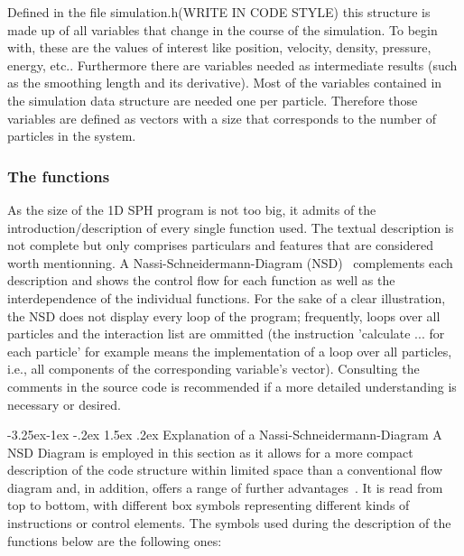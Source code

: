 \documentclass{report}
\makeatletter
\renewcommand\paragraph{\@startsection{paragraph}{4}{\z@}%
  {-3.25ex\@plus -1ex \@minus -.2ex}%
  {1.5ex \@plus .2ex}%
  {\normalfont\normalsize\bfseries}}
\makeatother
\begin{document}
Defined in the file simulation.h(WRITE IN CODE STYLE) this structure is made up of all 
variables that change in the course of the simulation. To begin with, these are the 
values of interest like position, velocity, density, pressure, energy, etc.. 
Furthermore there are variables needed as intermediate results (such as the smoothing 
length and its derivative). 
Most of the variables contained in the simulation data structure are needed one per 
particle. Therefore those variables are defined as vectors with a size that corresponds 
to the number of particles in the system. 

\subsubsection{The functions}

As the size of the 1D SPH program is not too big, it admits of the 
introduction/description of every single function used. The textual description is not complete but only comprises particulars and features that are considered worth mentionning. A Nassi-Schneidermann-Diagram (NSD)~\cite{Nassi1973} complements each description and shows the control flow for each function as well as the interdependence of the individual functions. For the sake of a clear illustration, the NSD does not display every loop of the program; frequently, loops over all particles and the interaction list are ommitted (the instruction 'calculate ... for each particle' for example means the implementation of a loop over all particles, i.e., all components of the corresponding variable's vector).  Consulting the comments in the source code is recommended if a more detailed understanding is necessary or desired.

\paragraph{Explanation of a Nassi-Schneidermann-Diagram}
A NSD Diagram is employed in this section as it allows for a more compact description of the code structure within limited space than a conventional flow diagram and, in addition, offers a range of further advantages~\cite{Nassi1973}. It is read from top to bottom, with different box symbols representing different kinds of instructions or control elements. The symbols used during the description of the functions below are the following ones:
\end{document}
